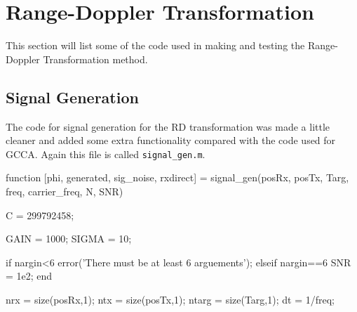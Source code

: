 \documentclass[12pt,openany,a4paper]{book}
\begin{document}
\section{Range-Doppler Transformation}
This section will list some of the code used in making and testing the Range-Doppler Transformation method.
\subsection{Signal Generation}
The code for signal generation for the RD transformation was made a little cleaner and added some extra functionality compared with the code used for GCCA. Again this file is called \verb+signal_gen.m+.

\begin{spverbatim}
function [phi, generated, sig_noise, rxdirect] = signal_gen(posRx, posTx, Targ, freq, carrier_freq, N, SNR)
%
%
%

C = 299792458;

GAIN = 1000; %
SIGMA = 10; %

if nargin<6
    error('There must be at least 6 arguements');
elseif nargin==6
    SNR = 1e2;
end

nrx = size(posRx,1);
ntx = size(posTx,1);
ntarg = size(Targ,1);
dt = 1/freq;


\end{spverbatim}
\end{document}
